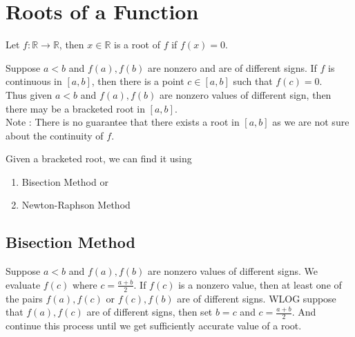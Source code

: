 \section{Roots of a Function}
\begin{definition}
	Let $f : \mathbb{R} \to \mathbb{R}$, then $x \in \mathbb{R}$ is a root of $f$ if $f(x) = 0$.
\end{definition}

\begin{remark}
	Suppose $a <  b$ and $f(a), f(b)$ are nonzero and are of different signs. If $f$ is continuous in $[a,b]$, then there is a point $c \in [a,b]$ such that $f(c) = 0$.\\
	
	Thus given $a<b$ and $f(a),f(b)$ are nonzero values of different sign, then there may be a bracketed root in $[a,b]$.\\
	
	Note : There is no guarantee that there exists a root in $[a,b]$ as we are not sure about the continuity of $f$.
\end{remark}

\begin{remark} Given a bracketed root, we can find it using
	\begin{enumerate}
		\item Bisection Method or
		\item Newton-Raphson Method
	\end{enumerate}
\end{remark}

\subsection{Bisection Method}
	Suppose $a < b$ and $f(a),f(b)$ are nonzero values of different signs. We evaluate $f(c)$ where $c = \frac{a+b}{2}$. If $f(c)$ is a nonzero value, then at least one of the pairs $f(a),f(c)$ or $f(c),f(b)$ are of different signs. WLOG suppose that $f(a),f(c)$ are of different signs, then set $b = c$ and $c = \frac{a+b}{2}$. And continue this process until we get sufficiently accurate value of a root.


